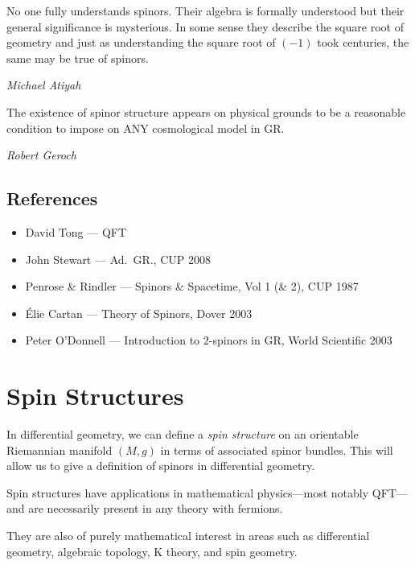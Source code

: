 
\begin{shadequote}
  No one fully understands spinors. Their algebra is formally understood but their general significance is mysterious. In some sense they describe the square root of geometry and just as understanding the square root of $(-1)$ took centuries, the same may be true of spinors.\par\emph{Michael Atiyah}
\end{shadequote}

\begin{shadequote}
  The existence of spinor structure appears on physical grounds to be a reasonable condition to impose on ANY cosmological model in GR.\par\emph{Robert Geroch}
\end{shadequote}

\subsection*{References}%

\begin{itemize}
  \item David Tong --- QFT
  \item John Stewart --- Ad.~GR., CUP 2008
  \item Penrose \& Rindler --- Spinors \& Spacetime, Vol 1 (\& 2), CUP 1987
  \item \'Elie Cartan --- Theory of Spinors, Dover 2003
  \item Peter O'Donnell --- Introduction to $2$-spinors in GR, World Scientific 2003
\end{itemize}

\section{Spin Structures}%
\label{sec:spin_structures}

In differential geometry, we can define a \emph{spin structure} on an orientable Riemannian manifold $(M, g)$ in terms of associated spinor bundles. This will allow us to give a definition of spinors in differential geometry.

Spin structures have applications in mathematical physics---most notably QFT---and are necessarily present in any theory with fermions.

They are also of purely mathematical interest in areas such as differential geometry, algebraic topology, K theory, and spin geometry.

